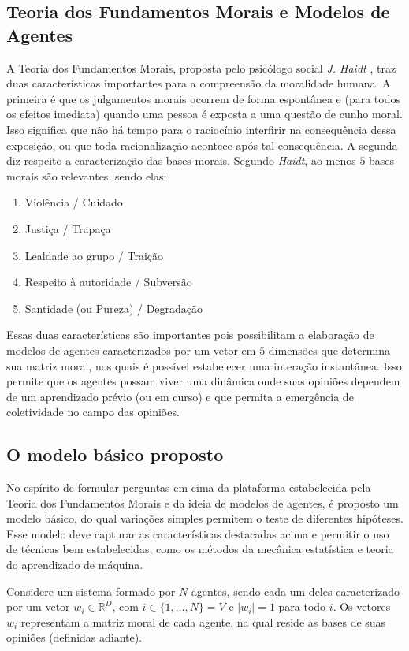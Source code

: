 \documentclass[11pt]{article}
\begin{document}
\subsection{Teoria dos Fundamentos Morais e Modelos de Agentes}

A Teoria dos Fundamentos Morais, proposta pelo psicólogo social {\it J.
Haidt} \cite{Haidt}, traz duas características importantes para a compreensão
da moralidade humana. A primeira é que os julgamentos morais ocorrem de forma
espontânea e (para todos os efeitos imediata) quando uma pessoa é exposta a uma
questão de cunho moral. Isso significa que não há tempo para o raciocínio
interfirir na consequência dessa exposição, ou que toda racionalização 
acontece após tal consequência. A segunda diz respeito a caracterização das
bases morais. Segundo {\it Haidt}, ao menos $5$ bases morais são relevantes,
sendo elas:
\begin{enumerate}
    \item Violência / Cuidado
    \item Justiça / Trapaça
    \item Lealdade ao grupo / Traição
    \item Respeito à autoridade / Subversão
    \item Santidade (ou Pureza) / Degradação
\end{enumerate}

Essas duas características são importantes pois possibilitam a elaboração de
modelos de agentes caracterizados por um vetor em $5$ dimensões 
que determina
sua matriz moral, nos quais é possível estabelecer uma interação instantânea. 
Isso permite que os agentes possam viver
uma dinâmica onde suas opiniões dependem de um aprendizado prévio (ou em curso)
e que permita a emergência de coletividade no campo das opiniões.

\subsection{O modelo básico proposto}

No espírito de formular perguntas em cima da plataforma estabelecida pela Teoria
dos Fundamentos Morais e da ideia de modelos de agentes, é proposto um modelo
básico, do qual variações simples permitem o teste de diferentes hipóteses. Esse
modelo deve capturar as características destacadas acima e permitir o uso de
técnicas bem estabelecidas, como os métodos da mecânica estatística e teoria do
aprendizado de máquina. 

Considere um sistema formado por $N$ agentes, sendo cada um deles caracterizado
por um vetor $w_i \in \mathbb{R}^D$, com $i \in \{1,\ldots,N\} = V$ e $|w_i|=1$ 
para
todo $i$. 
Os vetores $w_i$ representam a matriz moral de cada agente, na qual reside as
bases de suas opiniões (definidas adiante).
\end{document}
